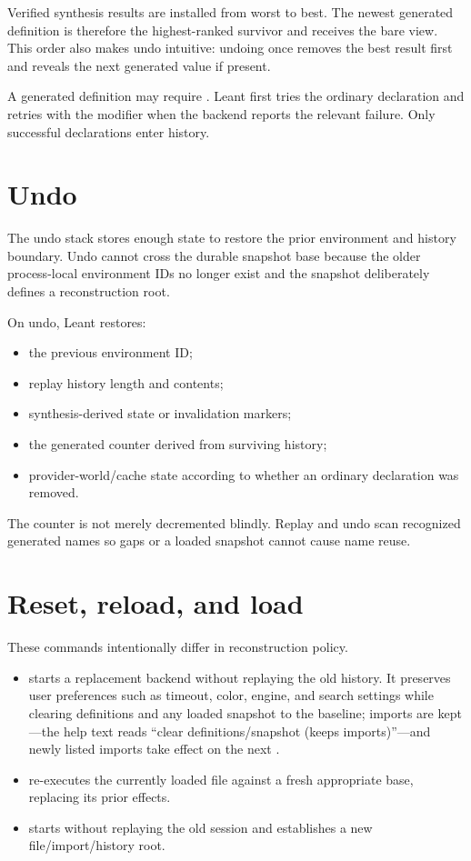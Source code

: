 \documentclass[10pt,letterpaper,oneside]{report}
\newcommand{\code}[1]{\texttt{\detokenize{#1}}}
\begin{document}
Verified synthesis results are installed from worst to best. The newest generated definition is therefore the highest-ranked survivor and receives the bare \code{it} view. This order also makes undo intuitive: undoing once removes the best result first and reveals the next generated value if present.

A generated definition may require \code{noncomputable}. Leant first tries the ordinary declaration and retries with the modifier when the backend reports the relevant failure. Only successful declarations enter history.

\section{Undo}

The undo stack stores enough state to restore the prior environment and history boundary. Undo cannot cross the durable snapshot base because the older process-local environment IDs no longer exist and the snapshot deliberately defines a reconstruction root.

On undo, Leant restores:

\begin{itemize}
  \item the previous environment ID;
  \item replay history length and contents;
  \item synthesis-derived state or invalidation markers;
  \item the generated \code{it} counter derived from surviving history;
  \item provider-world/cache state according to whether an ordinary declaration was removed.
\end{itemize}

The counter is not merely decremented blindly. Replay and undo scan recognized generated names so gaps or a loaded snapshot cannot cause name reuse.

\section{Reset, reload, and load}

These commands intentionally differ in reconstruction policy.

\begin{itemize}
  \item \code{:reset} starts a replacement backend without replaying the old history. It preserves user preferences such as timeout, color, engine, and search settings while clearing definitions and any loaded snapshot to the baseline; imports are kept---the help text reads ``clear definitions/snapshot (keeps imports)''---and newly listed imports take effect on the next \code{:reset}.
  \item \code{:reload} re-executes the currently loaded file against a fresh appropriate base, replacing its prior effects.
  \item \code{:load} starts without replaying the old session and establishes a new file/import/history root.
\end{itemize}
\end{document}
